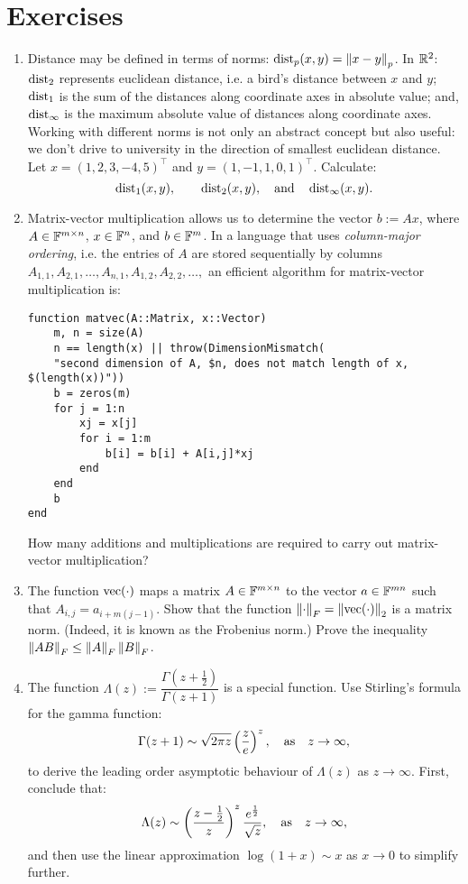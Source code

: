 \documentclass[11pt,letterpaper]{article}
\begin{document}
\section*{Exercises}

\begin{enumerate}

\item Distance may be defined in terms of norms: $\operatorname{dist}_p(x,y) = \left\|{x-y}\right\|_p$. In $\mathbb{R}^2$: $\operatorname{dist}_2$ represents euclidean distance, i.e. a bird's distance between $x$ and $y$; $\operatorname{dist}_1$ is the sum of the distances along coordinate axes in absolute value; and, $\operatorname{dist}_\infty$ is the maximum absolute value of distances along coordinate axes. Working with different norms is not only an abstract concept but also useful: we don't drive to university in the direction of smallest euclidean distance. Let $x = (1,2,3,-4,5)^\top$ and $y = (1,-1,1,0,1)^\top$. Calculate:
\[
\operatorname{dist}_1(x,y),\qquad \operatorname{dist}_2(x,y),\quad{\rm and}\quad \operatorname{dist}_\infty(x,y).
\]

\item Matrix-vector multiplication allows us to determine the vector $b := Ax$, where $A\in\mathbb{F}^{m\times n}$, $x\in\mathbb{F}^n$, and $b\in\mathbb{F}^m$. In a language that uses {\em column-major ordering}, i.e. the entries of $A$ are stored sequentially by columns $A_{1,1}, A_{2,1},\ldots,A_{n,1},A_{1,2},A_{2,2},\ldots,$ an efficient algorithm for matrix-vector multiplication is:
\begin{verbatim}
function matvec(A::Matrix, x::Vector)
    m, n = size(A)
    n == length(x) || throw(DimensionMismatch( 
    "second dimension of A, $n, does not match length of x, $(length(x))"))
    b = zeros(m)
    for j = 1:n
        xj = x[j]
        for i = 1:m
            b[i] = b[i] + A[i,j]*xj
        end
    end
    b
end
\end{verbatim}

How many additions and multiplications are required to carry out matrix-vector multiplication?

\item The function $\operatorname{vec}(\cdot)$ maps a matrix $A\in\mathbb{F}^{m\times n}$ to the vector $a\in\mathbb{F}^{mn}$ such that $A_{i,j} = a_{i+m(j-1)}$. Show that the function $\left\|{\cdot}\right\|_F = \left\|{\operatorname{vec}(\cdot)}\right\|_2$ is a matrix norm. (Indeed, it is known as the Frobenius norm.) Prove the inequality $\left\|{AB}\right\|_F \le \left\|{A}\right\|_F\left\|{B}\right\|_F$.

\item The function $\Lambda(z) := \dfrac{\Gamma(z+\frac{1}{2})}{\Gamma(z+1)}$ is a special function. Use Stirling's formula for the gamma function:
\[
\Gamma(z+1) \sim \sqrt{2\pi z}\left(\frac{z}{e}\right)^z,\quad{\rm as}\quad z\to\infty,
\]
to derive the leading order asymptotic behaviour of $\Lambda(z)$ as $z\to\infty$. First, conclude that:
\[
\Lambda(z) \sim \left(\frac{z-\frac{1}{2}}{z}\right)^z \frac{e^{\frac{1}{2}}}{\sqrt{z}},\quad{\rm as}\quad z\to\infty,
\]
and then use the linear approximation $\log(1+x) \sim x$ as $x\to0$ to simplify further.


\end{enumerate}
\end{document}

